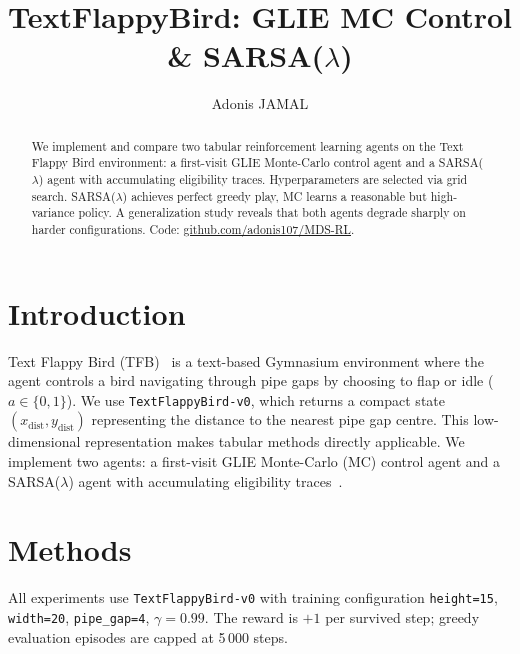 \documentclass[runningheads]{llncs}
\begin{document}
\title{TextFlappyBird: GLIE MC Control \& SARSA($\lambda$)}
\author{Adonis JAMAL}

\maketitle

\begin{abstract}
    We implement and compare two tabular reinforcement learning agents on the Text Flappy Bird environment: a first-visit GLIE Monte-Carlo control agent and a SARSA($\lambda$) agent with accumulating eligibility traces. Hyperparameters are selected via grid search. SARSA($\lambda$) achieves perfect greedy play, MC learns a reasonable but high-variance policy. A generalization study reveals that both agents degrade sharply on harder configurations. Code: \href{https://github.com/adonis107/MDS-RL/tree/main/individual\%20assignment}{github.com/adonis107/MDS-RL}.
\end{abstract}

\section{Introduction}
Text Flappy Bird (TFB)~\cite{tfb} is a text-based Gymnasium environment where the agent controls a bird navigating through pipe gaps by choosing to flap or idle ($a \in \{0, 1\}$). We use \texttt{TextFlappyBird-v0}, which returns a compact state $(x_\text{dist}, y_\text{dist})$ representing the distance to the nearest pipe gap centre. This low-dimensional representation makes tabular methods directly applicable. We implement two agents: a first-visit GLIE Monte-Carlo (MC) control agent and a SARSA($\lambda$) agent with accumulating eligibility traces~\cite{sutton2018}.

\section{Methods}
All experiments use \texttt{TextFlappyBird-v0} with training configuration \texttt{height=15}, \texttt{width=20}, \texttt{pipe\_gap=4}, $\gamma = 0.99$. The reward is $+1$ per survived step; greedy evaluation episodes are capped at 5\,000 steps.
\end{document}
